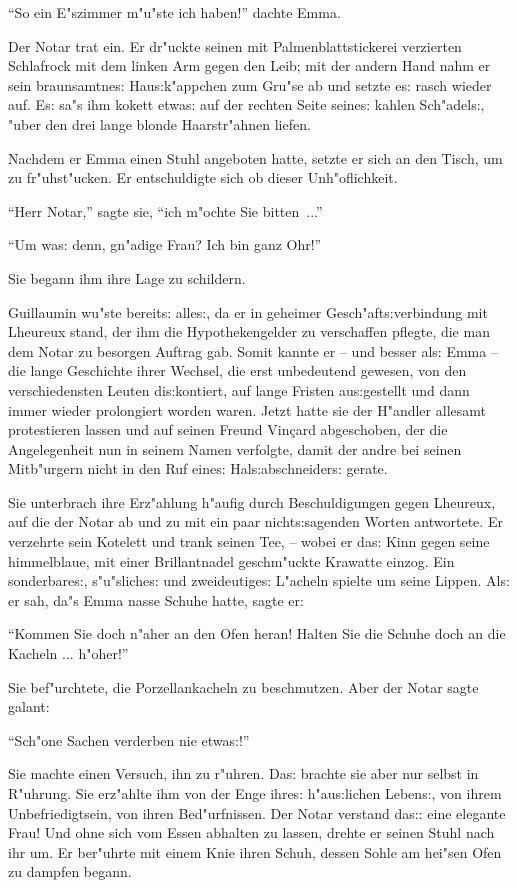 \documentclass[oneside,12pt]{book}
\newcommand{\s}{s:}%
\begin{document}
"`So ein E"szimmer m"u"ste ich haben!"' dachte Emma.

Der Notar trat ein. Er dr"uckte seinen mit Palmenblattstickerei
verzierten Schlafrock mit dem linken Arm gegen den Leib; mit der
andern Hand nahm er sein braunsamtne{\s} Hau{\s}k"appchen zum
Gru"se ab und setzte e{\s} rasch wieder auf. E{\s} sa"s ihm kokett
etwa{\s} auf der rechten Seite seine{\s} kahlen Sch"adel{\s},
"uber den drei lange blonde Haarstr"ahnen liefen.

Nachdem er Emma einen Stuhl angeboten hatte, setzte er sich an den
Tisch, um zu fr"uhst"ucken. Er entschuldigte sich ob dieser
Unh"oflichkeit.

"`Herr Notar,"' sagte sie, "`ich m"ochte Sie bitten~..."'

"`Um wa{\s} denn, gn"adige Frau? Ich bin ganz Ohr!"'

Sie begann ihm ihre Lage zu schildern.

Guillaumin wu"ste bereit{\s} alle{\s}, da er in geheimer
Gesch"aft{\s}verbindung mit Lheureux stand, der ihm die
Hypothekengelder zu verschaffen pflegte, die man dem Notar zu
besorgen Auftrag gab. Somit kannte er -- und besser al{\s} Emma --
die lange Geschichte ihrer Wechsel, die erst unbedeutend gewesen,
von den verschiedensten Leuten di{\s}kontiert, auf lange Fristen
au{\s}gestellt und dann immer wieder prolongiert worden waren.
Jetzt hatte sie der H"andler allesamt protestieren lassen und auf
seinen Freund Vin\c{c}ard abgeschoben, der die Angelegenheit nun
in seinem Namen verfolgte, damit der andre bei seinen Mitb"urgern
nicht in den Ruf eine{\s} Hal{\s}abschneider{\s} gerate.

Sie unterbrach ihre Erz"ahlung h"aufig durch Beschuldigungen gegen
Lheureux, auf die der Notar ab und zu mit ein paar
nicht{\s}sagenden Worten antwortete. Er verzehrte sein Kotelett
und trank seinen Tee, -- wobei er da{\s} Kinn gegen seine
himmelblaue, mit einer Brillantnadel geschm"uckte Krawatte einzog.
Ein sonderbare{\s}, s"u"sliche{\s} und zweideutige{\s} L"acheln
spielte um seine Lippen. Al{\s} er sah, da"s Emma nasse Schuhe
hatte, sagte er:

"`Kommen Sie doch n"aher an den Ofen heran! Halten Sie die Schuhe
doch an die Kacheln ... h"oher!"'

Sie bef"urchtete, die Porzellankacheln zu beschmutzen. Aber der
Notar sagte galant:

"`Sch"one Sachen verderben nie etwa{\s}!"'

Sie machte einen Versuch, ihn zu r"uhren. Da{\s} brachte sie aber
nur selbst in R"uhrung. Sie erz"ahlte ihm von der Enge ihre{\s}
h"au{\s}lichen Leben{\s}, von ihrem Unbefriedigtsein, von ihren
Bed"urfnissen. Der Notar verstand da{\s}: eine elegante Frau! Und
ohne sich vom Essen abhalten zu lassen, drehte er seinen Stuhl
nach ihr um. Er ber"uhrte mit einem Knie ihren Schuh, dessen Sohle
am hei"sen Ofen zu dampfen begann.
\end{document}
